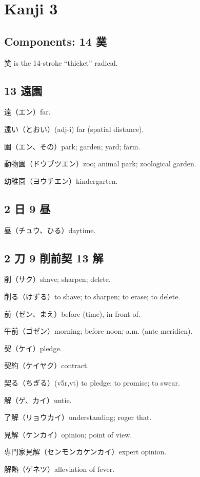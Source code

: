 \chapter{Kanji 3}

\section{Components: 14 菐}

菐 is the 14-stroke ``thicket'' radical.

\section{13 遠園}

遠（エン）far.

遠い（とおい）(adj-i) far (spatial distance).

園（エン、その）park; garden; yard; farm.

動物園（ドウブツエン）zoo; animal park; zoological garden.

幼稚園（ヨウチエン）kindergarten.

\section{2 日 9 昼}

昼（チュウ、ひる）daytime.

\section{2 刀 9 削前契 13 解}

削（サク）shave; sharpen; delete.

削る（けずる）to shave; to sharpen; to erase; to delete.

前（ゼン、まえ）before (time), in front of.

午前（ゴゼン）morning; before noon; a.m. (ante meridien).

契（ケイ）pledge.

契約（ケイヤク）contract.

契る（ちぎる）(v5r,vt) to pledge; to promise; to swear.

解（ゲ、カイ）untie.

了解（リョウカイ）understanding; roger that.

見解（ケンカイ）opinion; point of view.

専門家見解（センモンカケンカイ）expert opinion.

解熱（ゲネツ）alleviation of fever.

